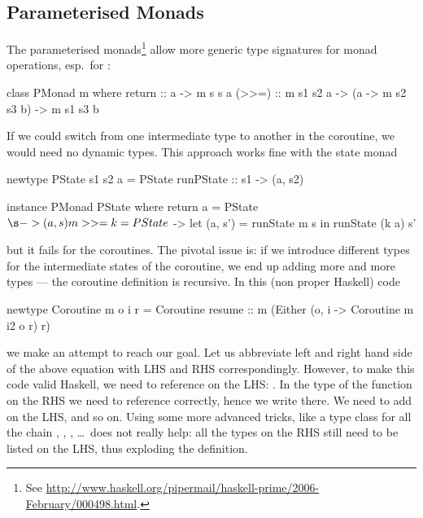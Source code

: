 \subsection{Parameterised Monads}
The parameterised monads\footnote{See \url{http://www.haskell.org/pipermail/haskell-prime/2006-February/000498.html}.}  allow more generic type signatures for monad operations, esp.\ for \hs{>>=}\xspace\nolinebreak[4] \cite{monad-parametrisable}:
\begin{code}
class PMonad m where
return :: a -> m s s a
(>>=)  :: m s1 s2 a -> (a -> m s2 s3 b) -> m s1 s3 b
\end{code}
If we could switch from one  intermediate type to another in the coroutine, we would need no dynamic types.
This approach works fine with the state monad
\begin{code}
newtype PState s1 s2 a
  = PState { runPState :: s1 -> (a, s2) }

instance PMonad PState where
return a  = PState $ \s -> (a, s)
m >>= k   = PState $ \s ->
              let (a, s') = runState m s
              in  runState (k a) s'
\end{code}
but it fails for the coroutines.
The pivotal issue is: if we introduce different types for the intermediate states of the coroutine, we end up adding more and more types --- the coroutine definition is recursive.
In this (non proper Haskell) code
\begin{code}
newtype Coroutine m o i r
  = Coroutine { resume :: m (Either (o, i
     -> Coroutine m i2 o r)  r) }
\end{code}
we make an attempt to reach our goal.
Let us abbreviate left and right hand side of the above equation with LHS and RHS correspondingly.
However, to make this code valid Haskell, we need to reference  on the LHS: .
In the type of the  function on the RHS we need to reference  correctly, hence we write  there.
We need to add  on the LHS, and so on.
Using some more advanced tricks, like a type class for all the chain , , , \dots\ does not really help: all the types on the RHS still need to be listed on the LHS, thus exploding the definition.

%

